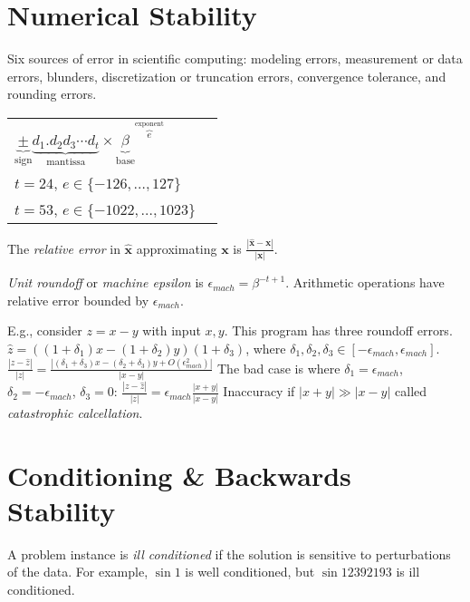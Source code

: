 \documentclass[landscape,10pt,letterpaper]{article}
\newcommand{\heading}[1]{\vspace{-1.5em} \section*{#1} \vspace{-1.0em}}
\begin{document}
\begin{multicols}{4}
\heading{Numerical Stability}

Six sources of error in scientific computing: modeling errors, measurement or data errors, blunders, discretization or truncation errors, convergence tolerance, and rounding errors.

\hspace{2em} \begin{tabular}{ll}
$\underbrace{\pm}_{\mathrm{sign}} \underbrace{d_1 . d_2d_3 \cdots d_t}_{\mathrm{mantissa}} \times {\underbrace{\beta}_{\mathrm{base}}}^{\overbrace{e}^{\mathrm{exponent}}}$ & \begin{minipage}{2in}
{\tiny For single and double: \\
$t=24$, $e \in \{ -126, \ldots, 127 \}$\\
$t=53$, $e \in \{ -1022, \ldots, 1023 \}$}
\end{minipage}
\end{tabular}

The \emph{relative error} in $\mathbf{\hat{x}}$ approximating $\mathbf{x}$ is $\frac{\left| \mathbf{\hat{x}} - \mathbf{x} \right|}{|\mathbf{x}|}$.

\emph{Unit roundoff} or \emph{machine epsilon} is $\epsilon_{mach} = \beta^{-t+1}$.  Arithmetic operations have relative error bounded by $\epsilon_{mach}$.

E.g., consider $z=x-y$ with input $x,y$.  This program has three roundoff errors.
$\hat{z} = \left( (1+\delta_1)x - (1+\delta_2)y \right) (1 + \delta_3)$, where $\delta_1, \delta_2, \delta_3 \in [ -\epsilon_{mach}, \epsilon_{mach} ]$.  $\frac{|z - \hat{z}|}{|z|} = \frac{|(\delta_1 + \delta_3)x - (\delta_2 + \delta_3)y + O(\epsilon_{mach}^2)|}{|x-y|}$
The bad case is where $\delta_1 = \epsilon_{mach}$, $\delta_2 = -\epsilon_{mach}$, $\delta_3 = 0$: $\frac{|z - \hat{z}|}{|z|} = \epsilon_{mach} \frac{|x+y|}{|x-y|}$
Inaccuracy if $|x+y|\!\gg\!|x-y|$ called \emph{catastrophic calcellation}.

\heading{Conditioning \& Backwards Stability}

A problem instance is \emph{ill conditioned} if the solution is sensitive to perturbations of the data.  For example, $\sin 1$ is well conditioned, but $\sin 12392193$ is ill conditioned.


\end{multicols}
\end{document}

